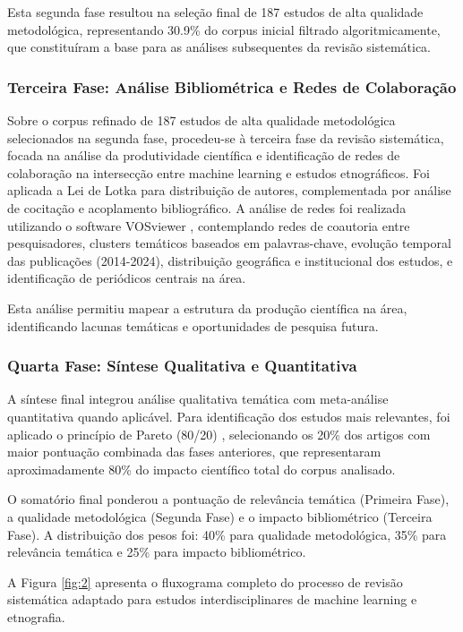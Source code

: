 Esta segunda fase resultou na seleção final de 187 estudos de alta qualidade metodológica, representando 30.9\% do corpus inicial filtrado algoritmicamente, que constituíram a base para as análises subsequentes da revisão sistemática.

\subsubsection{Terceira Fase: Análise Bibliométrica e Redes de Colaboração}

Sobre o corpus refinado de 187 estudos de alta qualidade metodológica selecionados na segunda fase, procedeu-se à terceira fase da revisão sistemática, focada na análise da produtividade científica e identificação de redes de colaboração na intersecção entre machine learning e estudos etnográficos. Foi aplicada a Lei de Lotka \cite{Lotka1926} para distribuição de autores, complementada por análise de cocitação e acoplamento bibliográfico. A análise de redes foi realizada utilizando o software VOSviewer \cite{VanEck2017}, contemplando redes de coautoria entre pesquisadores, clusters temáticos baseados em palavras-chave, evolução temporal das publicações (2014-2024), distribuição geográfica e institucional dos estudos, e identificação de periódicos centrais na área.

Esta análise permitiu mapear a estrutura da produção científica na área, identificando lacunas temáticas e oportunidades de pesquisa futura.

\subsubsection{Quarta Fase: Síntese Qualitativa e Quantitativa}

A síntese final integrou análise qualitativa temática com meta-análise quantitativa quando aplicável. Para identificação dos estudos mais relevantes, foi aplicado o princípio de Pareto (80/20) \cite{Pareto1964}, selecionando os 20\% dos artigos com maior pontuação combinada das fases anteriores, que representaram aproximadamente 80\% do impacto científico total do corpus analisado.

O somatório final ponderou a pontuação de relevância temática (Primeira Fase), a qualidade metodológica (Segunda Fase) e o impacto bibliométrico (Terceira Fase). A distribuição dos pesos foi: 40\% para qualidade metodológica, 35\% para relevância temática e 25\% para impacto bibliométrico.

A Figura \ref{fig:2} apresenta o fluxograma completo do processo de revisão sistemática adaptado para estudos interdisciplinares de machine learning e etnografia.

